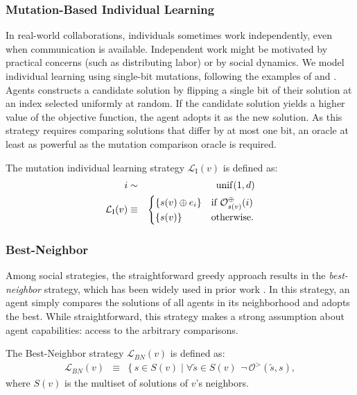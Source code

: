 \subsubsection{Mutation-Based Individual Learning}
In real-world collaborations, individuals sometimes work independently, even when communication is available. Independent work might be motivated by practical concerns (such as distributing labor) or by social dynamics. We model individual learning using single-bit mutations, following the examples of
\cite{lazer_network_2007} and \cite{barkoczi_social_2016}. Agents constructs a candidate solution by flipping a single bit of their solution at an index selected uniformly at random. If the candidate solution yields a higher value of the objective function, the agent adopts it as the new solution. As this strategy requires comparing solutions that differ by at most one bit, an oracle at least as powerful as the mutation comparison oracle is required.

\begin{definition}
The mutation individual learning strategy $\mathcal{L}_{\text{I}}(v)$ is defined as:
\begin{eqnarray}
i &\sim& \operatorname{unif}(1,d) \nonumber\\
\mathcal{L}_{\text{I}}(v) &\equiv&
\begin{cases}
\{s(v) \oplus e_i\} & \mbox{if $\mathcal{O}^{\oplus}_{s(v)}(i)$}
\\
\{s(v)\} & \mbox{otherwise}.
\end{cases}
\end{eqnarray}
\end{definition}

\subsubsection{Best-Neighbor}
Among social strategies, the straightforward greedy approach results in the {\em best-neighbor} strategy, which has been widely used in prior work \cite{lazer_network_2007, mason_propagation_2008, barkoczi_social_2016}. In this strategy, an agent simply compares the solutions of all agents in its neighborhood and adopts the best. While straightforward, this strategy makes a strong assumption about agent capabilities: access to the arbitrary comparisons.
\begin{definition}
The Best-Neighbor strategy $\mathcal{L}_{BN}(v)$ is defined as:
\begin{eqnarray}
\mathcal{L}_{BN}(v)
&\equiv&
\{ \, s \!\in\! S(v)
\mid
\forall \tilde{s} \!\in\! S(v) \, \
\lnot \, \mathcal{O}^{>}(\tilde{s}, s),
\end{eqnarray}
where $S(v)$ is the multiset of solutions of $v$'s neighbors.
\end{definition}

